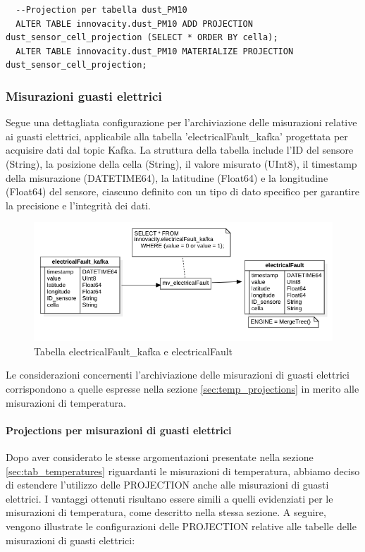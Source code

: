 \begin{lstlisting}
  --Projection per tabella dust_PM10
  ALTER TABLE innovacity.dust_PM10 ADD PROJECTION dust_sensor_cell_projection (SELECT * ORDER BY cella);
  ALTER TABLE innovacity.dust_PM10 MATERIALIZE PROJECTION dust_sensor_cell_projection;
\end{lstlisting}

\subsubsection{Misurazioni guasti elettrici} \label{sec:tab_guasti}
Segue una dettagliata configurazione per l'archiviazione delle misurazioni relative ai guasti elettrici, applicabile alla tabella 'electricalFault\_kafka' progettata per acquisire dati dal topic Kafka. La struttura della tabella include l'ID del sensore (String), la posizione della cella (String), il valore misurato (UInt8), il timestamp della misurazione (DATETIME64), la latitudine (Float64) e la longitudine (Float64) del sensore, ciascuno definito con un tipo di dato specifico per garantire la precisione e l'integrità dei dati.

\begin{figure}[H]
    \centering
    \includegraphics[width=1\textwidth]{../Images/SpecificaTecnica/electricalFault.png}
    \caption{Tabella electricalFault\_kafka e electricalFault}
    \label{fig:umidities}
  \end{figure}

Le considerazioni concernenti l'archiviazione delle misurazioni di guasti elettrici corrispondono a quelle espresse nella sezione \ref{sec:temp_projections} in merito alle misurazioni di temperatura.

\paragraph{Projections per misurazioni di guasti elettrici} 
Dopo aver considerato le stesse argomentazioni presentate nella sezione \ref{sec:tab_temperatures} riguardanti le misurazioni di temperatura, abbiamo deciso di estendere l'utilizzo delle PROJECTION anche alle misurazioni di guasti elettrici. I vantaggi ottenuti risultano essere simili a quelli evidenziati per le misurazioni di temperatura, come descritto nella stessa sezione. A seguire, vengono illustrate le configurazioni delle PROJECTION relative alle tabelle delle misurazioni di guasti elettrici:

